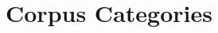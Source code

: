 \section{Corpus Categories}
\label{app:corpus}
\begin{table}[h]\centering
  \caption{Corpus categories (118 documents, 11 categories, English).}\label{tab:corpus-cats}
\end{table}
